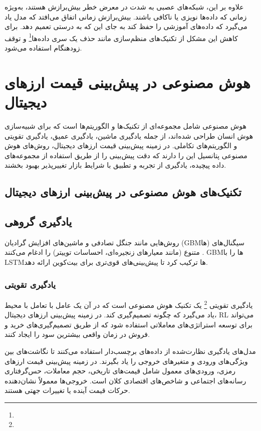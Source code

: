 علاوه بر این، شبکه‌های عصبی به شدت در معرض خطر بیش‌برازش هستند، به‌ویژه زمانی که داده‌ها نویزی یا ناکافی باشند. بیش‌برازش زمانی اتفاق می‌افتد که مدل یاد می‌گیرد که داده‌های آموزشی را حفظ کند به جای این که به درستی تعمیم دهد. برای کاهش این مشکل از تکنیک‌های منظم‌سازی مانند حذف یک سری داده‌ها\footnote{} و توقف زودهنگام استفاده می‌شود.


\section{هوش مصنوعی در پیش‌بینی قیمت ارزهای دیجیتال}

هوش مصنوعی شامل مجموعه‌ای از تکنیک‌ها و الگوریتم‌ها است که برای شبیه‌سازی هوش انسان طراحی شده‌اند، از جمله یادگیری ماشین، یادگیری عمیق، یادگیری تقویتی و الگوریتم‌های تکاملی. در زمینه پیش‌بینی قیمت ارزهای دیجیتال، روش‌های هوش مصنوعی پتانسیل این را دارند که دقت پیش‌بینی را از طریق استفاده از مجموعه‌های داده پیچیده، یادگیری از تجربه و تطبیق با شرایط بازار تغییرپذیر بهبود بخشند.

\subsection{تکنیک‌های هوش مصنوعی در پیش‌بینی ارزهای دیجیتال}

\subsection{یادگیری گروهی}
روش‌هایی مانند جنگل تصادفی و ماشین‌های افزایش گرادیان (GBMها) سیگنال‌های متنوع (مانند معیارهای زنجیره‌ای، احساسات توییتر) را ادغام می‌کنند \cite{philippas2019financial}. \cite{arroyo2021ensemble} GBMها را با LSTMها ترکیب کرد تا پیش‌بینی‌های قوی‌تری برای بیت‌کوین ارائه دهد.


\subsubsection{یادگیری تقویتی}
 
یادگیری تقویتی \footnote{} یک تکنیک هوش مصنوعی است که در آن یک عامل با تعامل با محیط یاد می‌گیرد که چگونه تصمیم‌گیری کند. در زمینه پیش‌بینی ارزهای دیجیتال، RL می‌تواند برای توسعه استراتژی‌های معاملاتی استفاده شود که از طریق تصمیم‌گیری‌های خرید و فروش در زمان واقعی بیشترین سود را ایجاد کنند.

مدل‌های یادگیری نظارت‌شده از داده‌های برچسب‌دار استفاده می‌کنند تا نگاشت‌های بین ویژگی‌های ورودی و متغیرهای خروجی را یاد بگیرند. در زمینه پیش‌بینی قیمت ارزهای رمزی، ورودی‌های معمول شامل قیمت‌های تاریخی، حجم معاملات، حس‌گرفتاری رسانه‌های اجتماعی و شاخص‌های اقتصادی کلان است. خروجی‌ها معمولاً نشان‌دهنده حرکات قیمت آینده یا تغییرات جهتی هستند.

